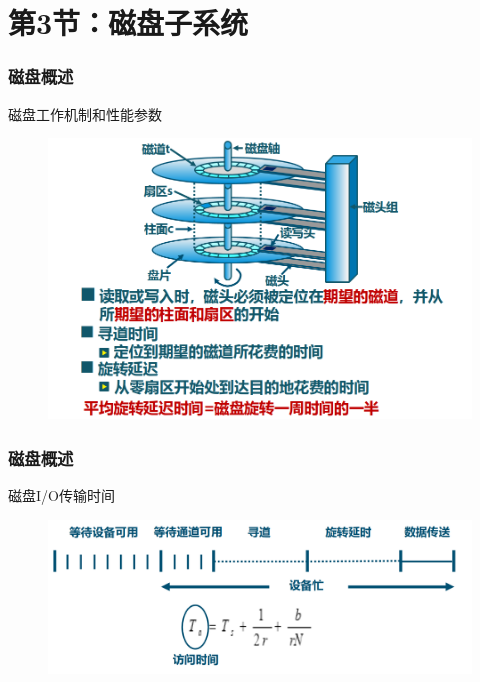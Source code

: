 \section{第3节：磁盘子系统} %
\begin{frame}[fragile]
    \frametitle{磁盘概述}
    磁盘工作机制和性能参数
    \begin{figure}
    \includegraphics[width=0.57\linewidth]{figs/disk.png}
    \end{figure}
\end{frame}

\begin{frame}[fragile]
    \frametitle{磁盘概述}
    磁盘I/O传输时间
    \begin{figure}
        \includegraphics[width=0.8\linewidth]{figs/disk-time1.png}
    \end{figure}
\end{frame}

